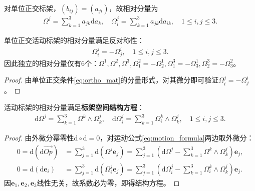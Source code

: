 \documentclass[../../main.tex]{subfiles}%
\begin{document}
\begin{definition}
对单位正交标架，$(b_{ij})=(a_{ji})$，故相对分量为
\begin{align}
\Omega^j=\sum\limits_{k=1}^3a_{jk}\mathrm{d}a_k,\quad \Omega_i^j=\sum\limits_{k=1}^3a_{jk}\mathrm{d}a_{ik},\quad 1\leqslant i,j\leqslant3.
\label{eq:ortho_rel_comp}
\end{align}
\end{definition}

\begin{proposition}
单位正交活动标架的相对分量满足反对称性：
\begin{align}
\Omega_i^j=-\Omega_j^i,\quad 1\leqslant i,j\leqslant3.
\label{eq:antisym_omega}
\end{align}
因此独立的相对分量仅有6个：$\Omega^1,\Omega^2,\Omega^3,\Omega_1^2=-\Omega_2^1,\Omega_1^3=-\Omega_3^1,\Omega_2^3=-\Omega_3^2$。
\end{proposition}
\begin{proof}

由单位正交条件\eqref{eq:ortho_mat}的分量形式，对其微分即可验证$\Omega_i^j=-\Omega_j^i$。

\end{proof}

\begin{theorem}
活动标架的相对分量满足\textbf{标架空间结构方程}：
\begin{align}
\mathrm{d}\Omega^j=\sum\limits_{k=1}^3\Omega^k\wedge\Omega_k^j,\quad \mathrm{d}\Omega_i^j=\sum\limits_{k=1}^3\Omega_i^k\wedge\Omega_k^j,\quad 1\leqslant i,j\leqslant3.
\label{eq:struct_eq_global}
\end{align}
\end{theorem}
\begin{proof}

由外微分幂零性$\mathrm{d}\circ\mathrm{d}=0$，对运动公式\eqref{eq:motion_formula}两边取外微分：
\begin{align*}
0=\mathrm{d}(\mathrm{d}\overrightarrow{Op})&=\sum\limits_{j=1}^3\mathrm{d}(\Omega^j\boldsymbol{e}_j)=\sum\limits_{j=1}^3\left(\mathrm{d}\Omega^j-\sum\limits_{k=1}^3\Omega^k\wedge\Omega_k^j\right)\boldsymbol{e}_j,\\
0=\mathrm{d}(\mathrm{d}\boldsymbol{e}_i)&=\sum\limits_{j=1}^3\mathrm{d}(\Omega_i^j\boldsymbol{e}_j)=\sum\limits_{j=1}^3\left(\mathrm{d}\Omega_i^j-\sum\limits_{k=1}^3\Omega_i^k\wedge\Omega_k^j\right)\boldsymbol{e}_j.
\end{align*}
因$\boldsymbol{e}_1,\boldsymbol{e}_2,\boldsymbol{e}_3$线性无关，故系数必为零，即得结构方程。

\end{proof}
\end{document}
